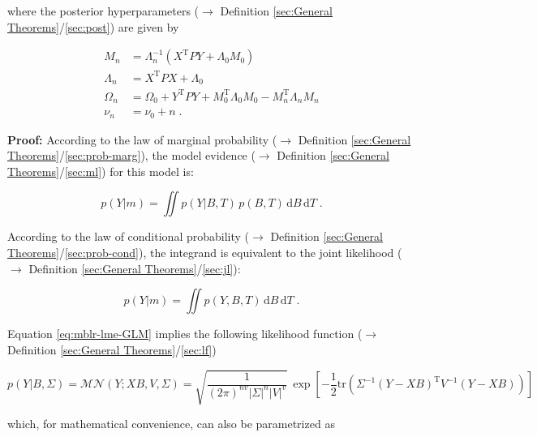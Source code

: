 \documentclass[a4paper,12pt,twoside]{book}
\begin{document}
where the posterior hyperparameters ($\rightarrow$ Definition \ref{sec:General Theorems}/\ref{sec:post}) are given by

\begin{equation} \label{eq:mblr-lme-GLM-NW-post-par}
\begin{split}
M_n &= \Lambda_n^{-1} (X^\mathrm{T} P Y + \Lambda_0 M_0) \\
\Lambda_n &= X^\mathrm{T} P X + \Lambda_0 \\
\Omega_n &= \Omega_0 + Y^\mathrm{T} P Y + M_0^\mathrm{T} \Lambda_0 M_0 - M_n^\mathrm{T} \Lambda_n M_n \\
\nu_n &= \nu_0 + n \; .
\end{split}
\end{equation}


\vspace{1em}
\textbf{Proof:} According to the law of marginal probability ($\rightarrow$ Definition \ref{sec:General Theorems}/\ref{sec:prob-marg}), the model evidence ($\rightarrow$ Definition \ref{sec:General Theorems}/\ref{sec:ml}) for this model is:

\begin{equation} \label{eq:mblr-lme-GLM-NW-ME-s1}
p(Y|m) = \iint p(Y|B,T) \, p(B,T) \, \mathrm{d}B \, \mathrm{d}T \; .
\end{equation}

According to the law of conditional probability ($\rightarrow$ Definition \ref{sec:General Theorems}/\ref{sec:prob-cond}), the integrand is equivalent to the joint likelihood ($\rightarrow$ Definition \ref{sec:General Theorems}/\ref{sec:jl}):

\begin{equation} \label{eq:mblr-lme-GLM-NW-ME-s2}
p(Y|m) = \iint p(Y,B,T) \, \mathrm{d}B \, \mathrm{d}T \; .
\end{equation}

Equation \eqref{eq:mblr-lme-GLM} implies the following likelihood function ($\rightarrow$ Definition \ref{sec:General Theorems}/\ref{sec:lf})

\begin{equation} \label{eq:mblr-lme-GLM-LF-Class}
p(Y|B,\Sigma) = \mathcal{MN}(Y; X B, V, \Sigma) = \sqrt{\frac{1}{(2 \pi)^{nv} |\Sigma|^n |V|^v}} \, \exp\left[ -\frac{1}{2} \mathrm{tr}\left( \Sigma^{-1} (Y-XB)^\mathrm{T} V^{-1} (Y-XB) \right) \right]
\end{equation}

which, for mathematical convenience, can also be parametrized as
\end{document}
